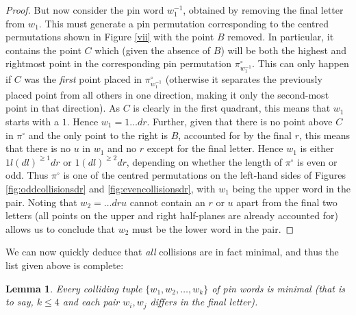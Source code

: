 \documentclass[11pt,a4paper]{article}
\newtheorem{lemma}[thm]{Lemma}
\theoremstyle{definition}
\begin{document}
\begin{proof}
But now consider the pin word $w_{1}^{-1}$, obtained by removing the final letter from $w_{1}$. This must generate a pin permutation corresponding to the centred permutations shown in Figure \ref{vii} with the point $B$ removed. In particular, it contains the point $C$ which (given the absence of $B$) will be both the highest  and rightmost point in the corresponding pin permutation $\pi^{\circ}_{w_{1}^{-1}}$. This can only happen if $C$ was the \emph{first} point placed in $\pi^{\circ}_{w_{1}^{-1}}$ (otherwise it separates the previously placed point from all others in one direction, making it only the second-most point in that direction). As $C$ is clearly in the first quadrant, this means that $w_{1}$ starts with a $1$. Hence $w_{1} = 1 \dots dr$. Further, given that there is no point above $C$ in $\pi^{\circ}$ and the only point to the right is $B$, accounted for by the final $r$, this means that there is no $u$ in $w_{1}$ and no $r$ except for the final letter. Hence $w_{1}$ is either $1l(dl)^{\geq 1}dr$ or $1(dl)^{\geq 2}dr$, depending on whether the length of $\pi^{\circ}$ is even or odd. Thus $\pi^{\circ}$ is one of the centred permutations on the left-hand sides of Figures \ref{fig:oddcollisionsdr} and \ref{fig:evencollisionsdr}, with $w_{1}$ being the upper word in the pair. Noting that $w_{2} = \dots dru$ cannot contain an $r$ or $u$ apart from the final two letters (all points on the upper and right half-planes are already accounted for) allows us to conclude that $w_{2}$ must be the lower word in the pair. \qedhere

\end{proof}

We can now quickly deduce that \emph{all} collisions are in fact minimal, and thus the list given above is complete:

\begin{lemma}

Every colliding tuple $\{w_{1},w_{2}, \dots, w_{k}\}$ of pin words is minimal (that is to say, $k \leq 4$ and each pair $w_{i},w_{j}$ differs in the final letter).

\end{lemma}
\end{document}

